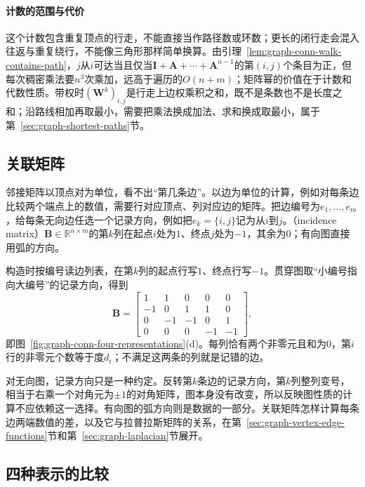 \paragraph{计数的范围与代价}
这个计数包含重复顶点的行走，不能直接当作路径数或环数；更长的闭行走会混入往返与重复绕行，不能像三角形那样简单换算。由引理~\ref{lem:graph-conn-walk-contains-path}，$j$从$i$可达当且仅当$\bm I+\bm A+\cdots+\bm A^{n-1}$的第$(i,j)$个条目为正，但每次稠密乘法要$n^3$次乘加，远高于遍历的$O(n+m)$；矩阵幂的价值在于计数和代数性质。带权时$(\bm W^k)_{i,j}$是行走上边权乘积之和，既不是条数也不是长度之和；沿路线相加再取最小，需要把乘法换成加法、求和换成取最小，属于第~\ref{sec:graph-shortest-paths}节。

\subsection{关联矩阵}
\label{sec:graph-conn-incidence-matrix}

邻接矩阵以顶点对为单位，看不出“第几条边”。以边为单位的计算，例如对每条边比较两个端点上的数值，需要行对应顶点、列对应边的矩阵。把边编号为$e_1,\ldots,e_m$，给每条无向边任选一个记录方向，例如把$e_k=\{i,j\}$记为从$i$到$j$。（incidence matrix）$\bm B\in\mathbb R^{n\times m}$的第$k$列在起点$i$处为$1$、终点$j$处为$-1$，其余为$0$；有向图直接用弧的方向。

构造时按编号读边列表，在第$k$列的起点行写$1$、终点行写$-1$。贯穿图取“小编号指向大编号”的记录方向，得到
\begin{equation}
\bm B=
\begin{bmatrix}
1&1&0&0&0\\
-1&0&1&1&0\\
0&-1&-1&0&1\\
0&0&0&-1&-1
\end{bmatrix},
\label{eq:graph-conn-running-incidence}
\end{equation}
即图~\ref{fig:graph-conn-four-representations}(d)。每列恰有两个非零元且和为$0$，第$i$行的非零元个数等于度$d_i$；不满足这两条的列就是记错的边。

对无向图，记录方向只是一种约定。反转第$k$条边的记录方向，第$k$列整列变号，相当于右乘一个对角元为$\pm1$的对角矩阵，图本身没有改变，所以反映图性质的计算不应依赖这一选择。有向图的弧方向则是数据的一部分。关联矩阵怎样计算每条边两端数值的差，以及它与拉普拉斯矩阵的关系，在第~\ref{sec:graph-vertex-edge-functions}节和第~\ref{sec:graph-laplacian}节展开。

\subsection{四种表示的比较}
\label{sec:graph-conn-representation-comparison}

